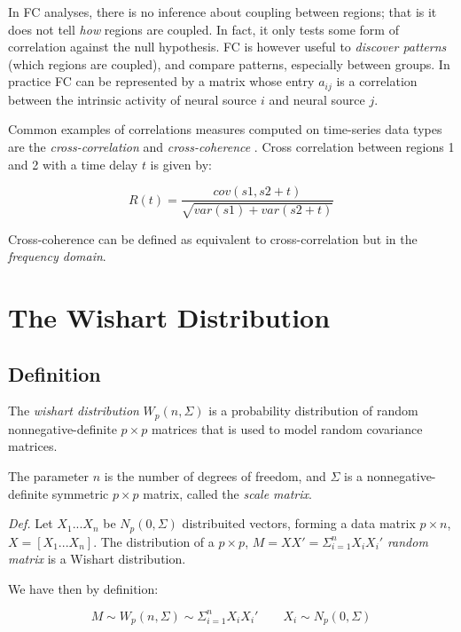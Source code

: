 \documentclass[12pt,openright,twoside,a4paper]{book}
\begin{document}
In FC analyses, there is no inference about coupling between regions; that is it does not tell \textit{how} regions are coupled.
In fact, it only tests some form of correlation against the null hypothesis.
FC is however useful to \textit{discover patterns} (which regions are coupled), and compare patterns, especially between groups.
In practice FC can be represented by a matrix whose entry $a_{ij}$ is a correlation between the intrinsic activity of neural source $i$ and neural source $j$.

Common examples of correlations measures computed on time-series data types are the \textit{cross-correlation} and \textit{cross-coherence} \cite{connect}.
Cross correlation between regions 1 and 2 with a time delay $t$ is given by:

\begin{equation}
R(t)= \frac{cov(s1,s2+t)}{\sqrt{var(s1)+var(s2+t)}}
\end{equation}

Cross-coherence can be defined as equivalent to cross-correlation but in the \textit{frequency domain}.

\chapter{The Wishart Distribution}

\section{Definition}

The \textit{wishart distribution} $ W_p(n, \Sigma)$ is a probability distribution of random nonnegative-definite $p\times p$ matrices that is used to model random covariance matrices.

The parameter $n$ is the number of degrees of freedom, and $\Sigma$ is a nonnegative-definite symmetric $p\times p$ matrix, called the \textit{scale matrix}.


\textit{Def.} Let $X_1...X_n$ be $N_p(0,\Sigma)$ distribuited vectors, forming a data matrix $p\times n$, $X=[X_1...X_n]$.
The distribution of  a $p\times p$, $M=XX'=\Sigma^n_{i=1}X_iX_i'$ \textit{random matrix}  is a Wishart distribution. \cite{AMS}

We have then by definition:

\begin{equation}
M\sim W_p(n, \Sigma)\sim\Sigma^n_{i=1}X_iX_i' \qquad X_i\sim N_p(0,\Sigma)   
\label{wsim}
\end{equation}
\end{document}
